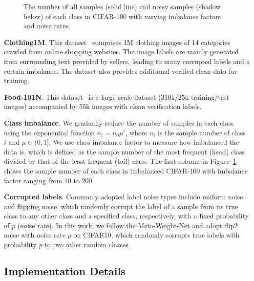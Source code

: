 \documentclass[letterpaper]{article} %
\newcommand{\bd}[1]{\textbf{#1}}
\begin{document}
\begin{figure}[t]
{\begin{minipage}[t]{0.48\linewidth}
\end{minipage}
}%
\centering
\vspace{-0.30cm} 
\caption{
The number of all samples (solid line) and noisy samples (shadow below) of each class in CIFAR-100 with varying imbalance factors and noise rates.
}
\label{fig:imb_noise_0}
\vspace{-0.50cm} 
\end{figure}

\noindent\bd{Clothing1M}. This dataset~\cite{xiao2015learning} comprises 1M clothing images of 14 categories crawled from online shopping websites. 
The image labels are mainly generated from surrounding text provided by sellers, leading to many corrupted labels and a certain imbalance. 
The dataset also provides additional verified clean data for training.

\noindent\bd{Food-101N}. This dataset~\cite{lee2018cleannet} is a large-scale dataset (310k/25k training/test images) accompanied by 55k images with clean verification labels. 


\noindent\bd{Class imbalance}. We gradually reduce the number of samples in each class using the exponential function $n_i=n_0\mu^i$, where $n_i$ is  the sample number of class $i$ and $\mu \in (0,1]$.
We use class imbalance factor to measure how imbalanced the data is, which is defined as the sample number of the most frequent (head) class divided by that of the least frequent (tail) class. 
The first column in Figure~\ref{fig:imb_noise_0} shows the sample number of each class in imbalanced CIFAR-100 with imbalance factor ranging from 10 to 200.

\noindent\bd{Corrupted labels}. 
Commonly adopted label noise types include uniform noise and flipping noise, which randomly corrupt the label of a sample from its true class to any other class and a specified class, respectively, with a fixed probability of $p$ (noise rate). 
In this work, we follow the Meta-Weight-Net and adopt flip2 noise with noise rate $p$ on CIFAR10, which randomly corrupts true labels with probability $p$ to two other random classes. 

\subsection{Implementation Details} \label{sec:implementaion}
\end{document}
